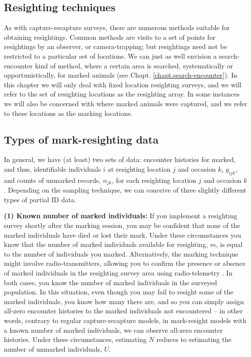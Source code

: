 \subsection{Resighting techniques}
As with capture-recapture surveys, there are numerous methods suitable
for obtaining resightings. Common methods are visits to a set of points
for resightings by an observer, or camera-trapping; but resightings
need not be restricted to a particular set of locations. We can just
as well envision a search-encounter kind of method, where a certain
area is searched, systematically or opportunistically, for marked
animals (see Chapt. \ref{chapt.search-encounter}). In this chapter we
will only deal with fixed location resighting surveys, and we will
refer to the set of resighting locations as the resighting array. In
some instances we will also be concerned with where marked animals
were captured, and we refer to these locations as the marking
locations.

\subsection{Types of mark-resighting data}

In general, we have (at least) two sets of data: encounter histories
for marked, and thus, identifiable individuals $i$ at resighting
location $j$ and occasion $k$, $y_{ijk}$, and counts of unmarked
records, $n_{jk}$, for each resighting location $j$ and occasion $k$.
Depending on the sampling technique, we can conceive of three slightly
different types of partial ID data.


{\flushleft \bf (1) Known number of marked individuals:} If you
implement a resighting survey shortly after the marking session, you
may be confident that none of the marked individuals have died or lost
their mark. Under these circumstances you know that the number of
marked individuals available for resighting, $m$, is equal to the
number of individuals you marked. Alternatively, the marking technique
might involve radio-transmitters, allowing you to confirm the presence
or absence of marked individuals in the resighting survey area using
radio-telemetry \citep{white_shenk:2001}. In both cases, you know the
number of marked individuals in the surveyed population.  In this
situation, even though you may fail to resight some of the marked
individuals, you know how many there are, and so you can simply assign
all-zero encounter histories to the marked individuals not encountered
-- in other words, contrary to regular capture-recapture models, in
mark-resight models with a known number of marked individuals, we can
observe all-zero encounter histories. Under these circumstances,
estimating $N$ reduces to estimating the number of unmarked
individuals, $U$.

